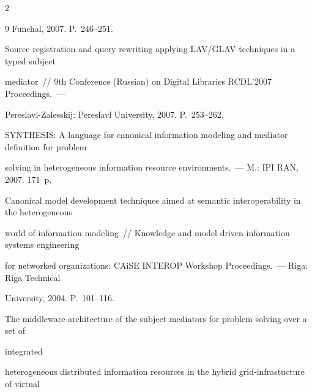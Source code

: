 \begin{multicols}{2}
{{\begin{thebibliography}{9}
Funchal, 2007.  P.~246--251.









Source registration and query rewriting applying LAV/GLAV techniques in a typed subject 


mediator~// 9th Conference (Russian) on Digital Libraries RCDL'2007 Proceedings.~--- 


Pereslavl-Zalesskij: Pereslavl University, 2007. P.~253--262.









SYNTHESIS: A language for canonical information modeling and mediator definition for problem 


solving in heterogeneous information resource environments.~--- M.: IPI RAN, 2007. 171~p.









Canonical model development techniques aimed at semantic interoperability in the heterogeneous 


world of information modeling~// Knowledge and model driven information systems engineering 


for networked organizations: CAiSE INTEROP Workshop Proceedings.~--- Riga: Riga Technical 


University, 2004.  P.~101--116.












The middleware architecture of the subject mediators for problem solving over a set of 


integrated 


heterogeneous distributed information resources in the hybrid grid-infrastucture of virtual 



\end{thebibliography}}}
\end{multicols}
